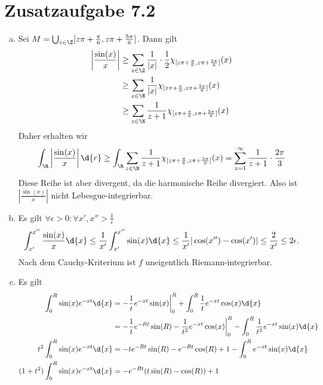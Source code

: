 \documentclass{article}
\begin{document}
    \section*{Zusatzaufgabe 7.2}
    \begin{enumerate}[(a)]
        \item Sei $M = \bigcup_{z \in \Z} [z\pi + \frac{\pi}{6}, z\pi + \frac{5\pi}{6}]$.
        Dann gilt
        \begin{align*}
            \left|\frac{\sin(x)}{x}\right| &\geq \sum_{z \in \Z} \frac{1}{|x|} \cdot \frac{1}{2} \chi_{[z\pi + \frac{\pi}{6}, z\pi + \frac{5\pi}{6}]}(x)\\
            &\geq \sum_{z \in \N} \frac{1}{|x|} \chi_{[z\pi + \frac{\pi}{6}, z\pi + \frac{5\pi}{6}]}(x)\\
            &\geq \sum_{z \in \N} \frac{1}{z+1} \chi_{[z\pi + \frac{\pi}{6}, z\pi + \frac{5\pi}{6}]}(x)
        \end{align*}
        Daher erhalten wir
        \[
            \int_{\R} \left|\frac{\sin(x)}{x}\right| \d{r} \geq \int_{\R} \sum_{z \in \N} \frac{1}{z+1} \chi_{[z\pi + \frac{\pi}{6}, z\pi + \frac{5\pi}{6}]}(x) = \sum_{z = 1}^{\infty} \frac{1}{z+1} \cdot \frac{2\pi}{3}
        \]
        Diese Reihe ist aber divergent, da die harmonische Reihe divergiert. Also ist $\left|\frac{\sin(x)}{x}\right|$ nicht Lebesgue-integrierbar.
        \item Es gilt $\forall \epsilon > 0\colon \forall x', x'' > \frac{1}{\epsilon}$
        \begin{align*}
            \int_{x'}^{x''} \frac{\sin(x)}{x} \d{x} \leq \frac{1}{x'} \int_{x'}^{x''} \sin(x)\d{x} \leq \frac{1}{x'} |\cos(x'') - \cos(x')| \leq \frac{2}{x'} \leq 2\epsilon.
        \end{align*}
        Nach dem Cauchy-Kriterium ist $f$ uneigentlich Riemann-integrierbar.
        \item Es gilt
        \begin{align*}
            \int_0^R \sin(x) e^{-xt} \d{x} &= - \frac{1}{t} e^{-xt}\sin(x)\bigg|_0^R + \int_0^R\frac{1}{t}e^{-xt}\cos(x)\d{x}\\
            &= -\frac{1}{t} e^{-Rt}\sin(R) - \frac{1}{t^2} e^{-xt} \cos(x) \bigg|_0^R - \int_0^R \frac{1}{t^2} e^{-xt} \sin(x) \d{x}\\
            t^2 \int_0^R \sin(x) e^{-xt} \d{x} &= -t e^{-Rt}\sin(R) - e^{-Rt} \cos(R) + 1 - \int_0^R e^{-xt} \sin(x) \d{x}\\
            (1 + t^2) \int_0^R \sin(x) e^{-xt} \d{x} &= -e^{-Rt} (t\sin(R) - \cos(R)) + 1\\

\end{align*}
\end{enumerate}
\end{document}
